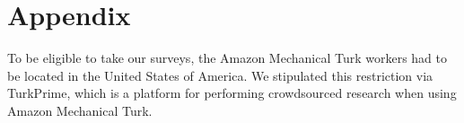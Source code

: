 \documentclass[letterpaper]{article} %
\begin{document}


\newpage


\newpage
\appendix
\section{Appendix}

To be eligible to take our surveys, the Amazon Mechanical Turk workers had to be located in the United States of America. We stipulated this restriction via TurkPrime, which is a platform for performing crowdsourced research when using Amazon Mechanical Turk. 
\end{document}
